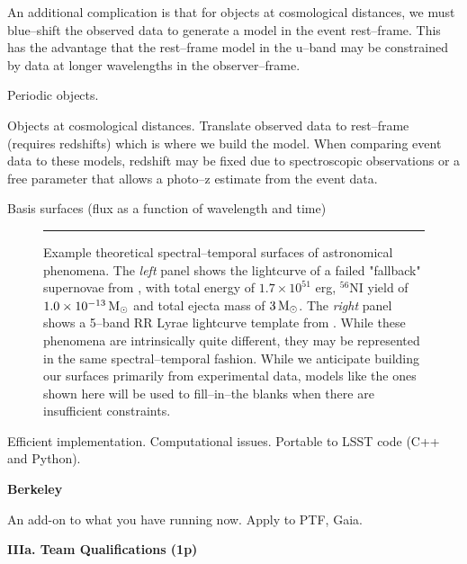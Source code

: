 An additional complication is that for objects at cosmological distances, we
must blue--shift the observed data to generate a model in the event rest--frame.
 This has the advantage that the rest--frame model in the u--band may be
constrained by data at longer wavelengths in the observer--frame.

Periodic objects.

Objects at cosmological distances.  Translate observed data to rest--frame
(requires redshifts) which is where we build the model.  When comparing event
data to these models, redshift may be fixed due to spectroscopic observations or
a free parameter that allows a photo--z estimate from the event data.

Basis surfaces (flux as a function of wavelength and time)

\begin{figure}[t]
\centerline{ \hfil
{}} \smallskip
\caption[]{\footnotesize Example theoretical spectral--temporal surfaces of
astronomical phenomena.  The {\it left} panel shows the lightcurve of a failed
"fallback" supernovae from \cite{2009ApJ...707..193F}, with total energy of $1.7
\times 10^{51}$ erg, $^{56}$NI yield of $1.0 \times 10^{-13} {\rm\,M_\odot}$ and total
ejecta mass of $3 {\rm\,M_\odot}$.  The {\it right} panel shows a 5--band RR Lyrae
lightcurve template from \cite{2010ApJ...708..717S}.  While these phenomena are
intrinsically quite different, they may be represented in the same
spectral--temporal fashion.  While we anticipate building our surfaces primarily
from experimental data, models like the ones shown here will be used to
fill--in--the blanks when there are insufficient constraints.} \medskip \hrule
\label{fig:sts} \end{figure}


 

Efficient implementation.  Computational issues.  Portable to LSST code (C++ and
Python).

 \smallskip
{\bf Berkeley}

An add-on to what you have running now.  Apply to PTF, Gaia.



\bigskip \centerline{\bf IIIa. Team Qualifications (1p)} \smallskip

 \smallskip

